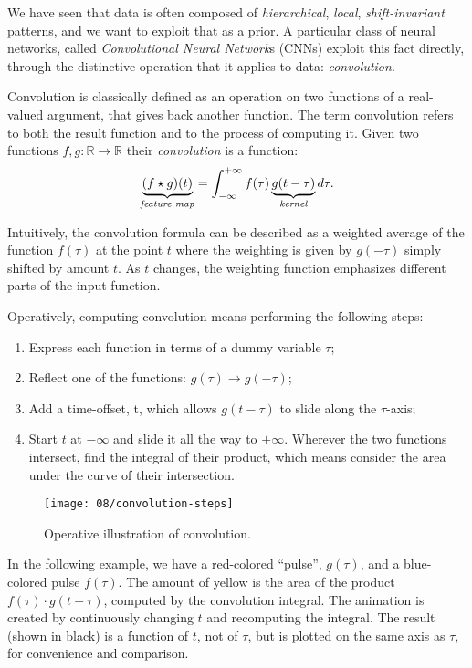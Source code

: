 
We have seen that data is often composed of \emph{hierarchical}, \emph{local}, \emph{shift-invariant} patterns, and we want to exploit that as a prior. A particular class of neural networks, called \emph{Convolutional Neural Network}s (CNNs) exploit this fact directly, through the distinctive operation that it applies to data: \emph{convolution}.

Convolution is classically defined as an operation on two functions of a real-valued argument, that gives back another function. The term convolution refers to both the result function and to the process of computing it. 
Given two functions $f, g: \mathbb{R} \rightarrow \mathbb{R}$ their \emph{convolution} is a function:  
\begin{equation}
    \underbrace{(f\star g)(t)}_{\emph{\textrm{feature map}}} = \int_{-\infty}^{+\infty} f(\tau) \underbrace{g(t-\tau)}_{\emph{\textrm{kernel}}} d \tau.
\end{equation}

Intuitively, the convolution formula can be described as a weighted average of the function $f(\tau)$ at the point $t$ where the weighting is given by $g(-\tau)$ simply shifted by amount $t$. As $t$ changes, the weighting function emphasizes different parts of the input function. 

Operatively, computing convolution means performing the following steps:
\begin{enumerate}
    \item Express each function in terms of a dummy variable $\tau$;
    \item Reflect one of the functions: $g(\tau ) \to g(-\tau )$;
    \item Add a time-offset, t, which allows $g(t-\tau )$ to slide along the $\tau$-axis;
    \item Start $t$ at $-\infty$ and slide it all the way to $+\infty$. Wherever the two functions intersect, find the integral of their product, which means consider the area under the curve of their intersection.
\end{enumerate}

\begin{figure}[H]
    \centering
    \texttt{[image: 08/convolution-steps]}
    \caption{Operative illustration of convolution.}
\end{figure}

In the following example, we have a red-colored ``pulse'', $g(\tau)$, and a blue-colored pulse $f(\tau)$. The amount of yellow is the area of the product $f(\tau )\cdot g(t-\tau )$, computed by the convolution integral. The animation is created by continuously changing $t$ and recomputing the integral. The result (shown in black) is a function of $t$, not of $\tau$, but is plotted on the same axis as $\tau$, for convenience and comparison.

